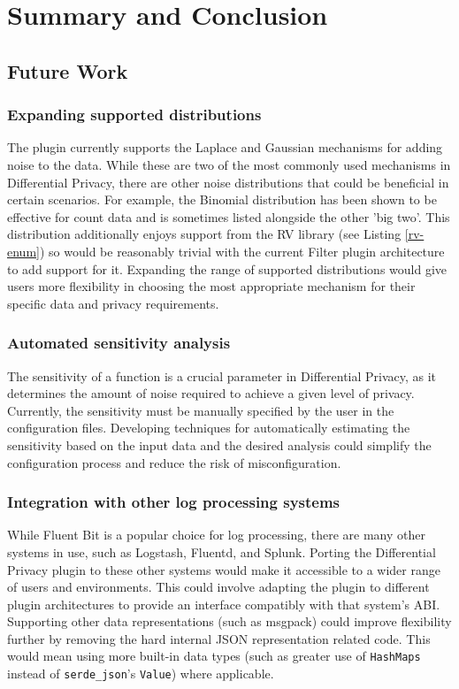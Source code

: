 \chapter{Summary and Conclusion\label{chap:conclusion}}
\section{Future Work}
\subsection{Expanding supported distributions}
The plugin currently supports the Laplace and Gaussian mechanisms for adding noise to the data. While these are two of the most commonly used mechanisms in Differential Privacy, there are other noise distributions that could be beneficial in certain scenarios. For example, the Binomial distribution has been shown to be effective for count data and is sometimes listed alongside the other 'big two'\cite{Dwork2006calibrating}. This distribution additionally enjoys support from the RV library (see Listing \ref{rv-enum}) so would be reasonably trivial with the current Filter plugin architecture to add support for it. Expanding the range of supported distributions would give users more flexibility in choosing the most appropriate mechanism for their specific data and privacy requirements.

\subsection{Automated sensitivity analysis}
The sensitivity of a function is a crucial parameter in Differential Privacy, as it determines the amount of noise required to achieve a given level of privacy. Currently, the sensitivity must be manually specified by the user in the configuration files. Developing techniques for automatically estimating the sensitivity based on the input data and the desired analysis could simplify the configuration process and reduce the risk of misconfiguration.

\subsection{Integration with other log processing systems}
While Fluent Bit is a popular choice for log processing, there are many other systems in use, such as Logstash, Fluentd, and Splunk. Porting the Differential Privacy plugin to these other systems would make it accessible to a wider range of users and environments. This could involve adapting the plugin to different plugin architectures to provide an interface compatibly with that system's ABI. Supporting other data representations (such as msgpack) could improve flexibility further by removing the hard internal JSON representation related code. This would mean using more built-in data types (such as greater use of \texttt{HashMaps} instead of \texttt{serde\_json}'s \texttt{Value}) where applicable.

